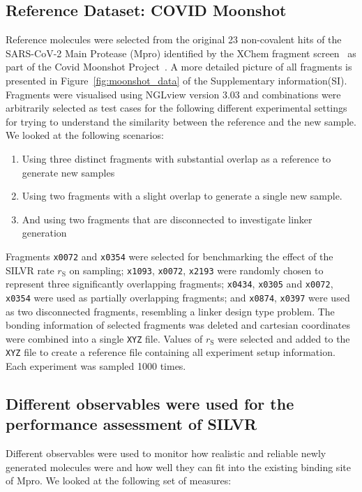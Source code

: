 \documentclass[journal=jacsat,manuscript=article]{achemso}
\begin{document}
\subsection{Reference Dataset: COVID Moonshot}
Reference molecules were selected from the original 23 non-covalent hits of the SARS-CoV-2 Main Protease (Mpro) identified by the XChem fragment screen~\cite{douangamath2020crystallographic} as part of the Covid Moonshot Project~\cite{consortium2023open, consortium2021open}. A more detailed picture of all fragments is presented in Figure~\ref{fig:moonshot_data} of the Supplementary information(SI). Fragments were visualised using NGLview version 3.03 and combinations were arbitrarily selected as test cases for the following different experimental settings for trying to understand the similarity between the reference and the new sample. We looked at the following scenarios:
\begin{enumerate}
    \item Using three distinct fragments with substantial overlap as a reference to generate new samples
    \item Using two fragments with a slight overlap to generate a single new sample.
    \item And using two fragments that are disconnected to investigate linker generation
\end{enumerate}
Fragments \texttt{x0072} and \texttt{x0354} were selected for benchmarking the effect of the SILVR rate $r_{\mathrm{S}}$ on sampling; \texttt{x1093}, \texttt{x0072}, \texttt{x2193} were randomly chosen to represent three significantly overlapping fragments; \texttt{x0434}, \texttt{x0305} and \texttt{x0072}, \texttt{x0354} were used as partially overlapping fragments; and \texttt{x0874}, \texttt{x0397} were used as two disconnected fragments, resembling a linker design type problem. The bonding information of selected fragments was deleted and cartesian coordinates were combined into a single \texttt{XYZ} file. Values of $r_{\mathrm{S}}$ were selected and added to the \texttt{XYZ} file to create a reference file containing all experiment setup information. Each experiment was sampled 1000 times. 

\subsection{Different observables were used for the performance assessment of SILVR}

Different observables were used to monitor how realistic and reliable newly generated molecules were and how well they can fit into the existing binding site of Mpro. We looked at the following set of measures:
\end{document}
